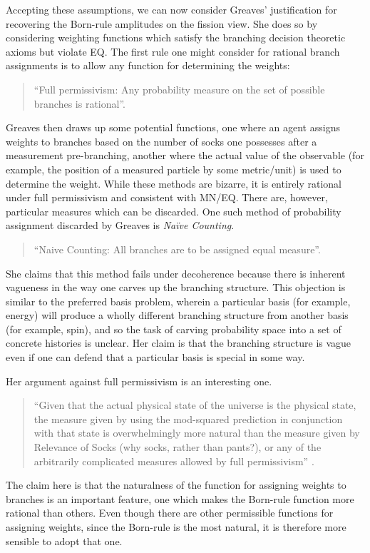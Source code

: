 \documentclass{article}
\begin{document}
Accepting these assumptions, we can now consider Greaves' justification for recovering the Born-rule amplitudes on the fission view. She does so by considering weighting functions which satisfy the branching decision theoretic axioms but violate EQ. The first rule one might consider for rational branch assignments is to allow any function for determining the weights:
\begin{quote}
	``Full permissivism: Any probability measure on the set of possible branches is rational''\parencite[11]{greavesProbabilityEverettInterpretation2007}.
\end{quote}
Greaves then draws up some potential functions, one where an agent assigns weights to branches based on the number of socks one possesses after a measurement pre-branching, another where the actual value of the observable (for example, the position of a measured particle by some metric/unit) is used to determine the weight. While these methods are bizarre, it is entirely rational under full permissivism and consistent with MN/EQ. There are, however, particular measures which can be discarded. One such method of probability assignment discarded by Greaves is \emph{Naïve Counting}.
\begin{quote}
	``Naive Counting: All branches are to be assigned equal measure''\parencite[11]{greavesProbabilityEverettInterpretation2007}.
\end{quote}
She claims that this method fails under decoherence because there is inherent vagueness in the way one carves up the branching structure. 
This objection is similar to the preferred basis problem, wherein a particular basis (for example, energy) will produce a wholly different branching structure from another basis (for example, spin), and so the task of carving probability space into a set of concrete histories is unclear.
Her claim is that the branching structure is vague even if one can defend that a particular basis is special in some way. 

Her argument against full permissivism is an interesting one.
\begin{quote}
 ``Given that the actual physical state of the universe is the physical state, the measure given by using the mod-squared prediction in conjunction with that state is overwhelmingly more natural than the measure given by Relevance of Socks (why socks, rather than pants?), or any of the arbitrarily complicated measures allowed by full permissivism'' \parencite{greavesProbabilityEverettInterpretation2007}.
\end{quote}
The claim here is that the naturalness of the function for assigning weights to branches is an important feature, one which makes the Born-rule function more rational than others. Even though there are other permissible functions for assigning weights, since the Born-rule is the most natural, it is therefore more sensible to adopt that one.
\end{document}
